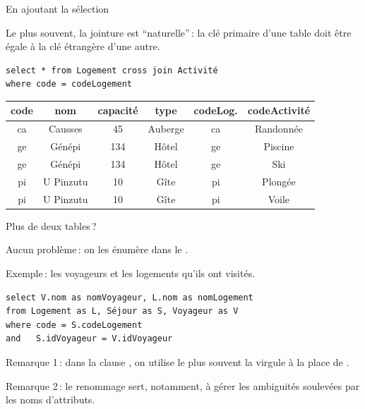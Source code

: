\begin{frame}[fragile]{En ajoutant la sélection}

Le plus souvent, la jointure est ``naturelle''\,: la clé primaire
d'une table doit être égale à la clé étrangère d'une autre.
\vfill

\begin{verbatim}
select * from Logement cross join Activité
where code = codeLogement
\end{verbatim}

\vfill
\begin{footnotesize}
\begin{tabular}{c|c|c|c|c|c}
\textbf{code} & \textbf{nom} & \textbf{capacité} & \textbf{type} & \textbf{codeLog.} & \textbf{codeActivité}\\ \hline 
ca & Causses & 45 & Auberge & ca & Randonnée\\ \hline 
ge & Génépi & 134 & Hôtel & ge & Piscine\\ \hline 
ge & Génépi & 134 & Hôtel & ge & Ski\\ \hline 
pi & U Pinzutu & 10 & Gîte & pi & Plongée\\ \hline 
pi & U Pinzutu & 10 & Gîte & pi & Voile\\ \hline 
\end{tabular}
\end{footnotesize}

\end{frame}

\begin{frame}[fragile]{Plus de deux tables\,?}

Aucun problème\,: on les énumère dans le .

\vfill
Exemple\,: les voyageurs et les logements qu'ils ont visités.

\vfill

\begin{verbatim}
select V.nom as nomVoyageur, L.nom as nomLogement
from Logement as L, Séjour as S, Voyageur as V
where code = S.codeLogement
and   S.idVoyageur = V.idVoyageur
\end{verbatim}

\vfill

\alert{Remarque 1}\,: dans la clause , on utilise le plus souvent 
la virgule à la place de . 

\vfill

\alert{Remarque 2}\,: le renommage  sert, notamment,
à  gérer les ambiguités soulevées par les noms d'attributs.

\end{frame}



